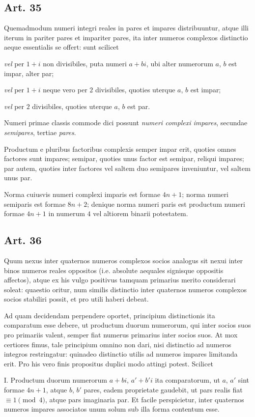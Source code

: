\documentclass[12pt]{article}
\newcommand{\art}[1]{\subsection*{Art. #1}}
\begin{document}
\art{35}

Quemadmodum numeri integri reales in pares et impares distribuuntur, atque illi iterum in pariter pares et impariter pares, ita inter numeros complexos distinctio aeque essentialis se offert: sunt scilicet

\textit{vel} per $1+i$ non divisibiles, puta numeri $a+bi$, ubi alter numerorum $a$, $b$ est impar, alter par;

\textit{vel} per $1+i$ neque vero per $2$ divisibiles, quoties uterque $a$, $b$ est impar;

\textit{vel} per $2$ divisibiles, quoties uterque $a$, $b$ est par.

Numeri primae classis commode dici possunt \textit{numeri complexi impares}, secundae \textit{semipares}, tertiae \textit{pares}.

Productum e pluribus factoribus complexis semper impar erit, quoties omnes factores sunt impares; semipar, quoties unus factor est semipar, reliqui impares; par autem, quoties inter factores vel saltem duo semipares inveniuntur, vel saltem unus par.

Norma cuiusvis numeri complexi imparis est formae $4n+1$; norma numeri semiparis est formae $8n+2$; denique norma numeri paris est productum numeri formae $4n+1$ in numerum $4$ vel altiorem binarii potestatem.

\art{36}

Quum nexus inter quaternos numeros complexos socios analogus sit nexui inter binos numeros reales oppositos (i.e. absolute aequales signisque oppositis affectos), atque ex his vulgo positivus tamquam primarius merito considerari soleat: quaestio oritur, num similis distinctio inter quaternos numeros complexos socios stabiliri possit, et pro utili haberi debeat.

Ad quam decidendam perpendere oportet, principium distinctionis ita comparatum esse debere, ut productum duorum numerorum, qui inter socios suos pro primariis valent, semper fiat numerus primarius inter socios suos. At mox certiores fimus, tale principium omnino non dari, nisi distinctio ad numeros integros restringatur: quinadeo distinctio utilis ad numeros impares limitanda erit. Pro his vero finis propositus duplici modo attingi potest. Scilicet

I. Productum duorum numerorum $a+bi$, $a'+b'i$ ita comparatorum, ut $a$, $a'$ sint formae $4n+1$, atque $b$, $b'$ pares, eadem proprietate gaudebit, ut pars realis fiat $\equiv 1 \pmod{4}$, atque pars imaginaria par. Et facile perspicietur, inter quaternos numeros impares associatos unum solum sub illa forma contentum esse.
\end{document}
